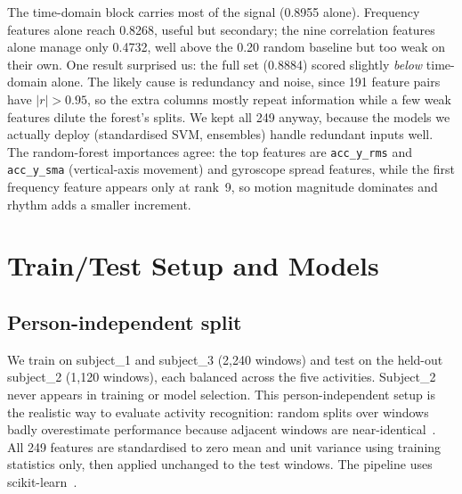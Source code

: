 \documentclass[runningheads]{llncs}
\begin{document}
The time-domain block carries most of the signal (0.8955 alone). Frequency features alone reach 0.8268, useful but secondary; the nine correlation features alone manage only 0.4732, well above the 0.20 random baseline but too weak on their own. One result surprised us: the full set (0.8884) scored slightly \emph{below} time-domain alone. The likely cause is redundancy and noise, since 191 feature pairs have $|r| > 0.95$, so the extra columns mostly repeat information while a few weak features dilute the forest's splits. We kept all 249 anyway, because the models we actually deploy (standardised SVM, ensembles) handle redundant inputs well. The random-forest importances agree: the top features are \texttt{acc\_y\_rms} and \texttt{acc\_y\_sma} (vertical-axis movement) and gyroscope spread features, while the first frequency feature appears only at rank~9, so motion magnitude dominates and rhythm adds a smaller increment.


\section{Train/Test Setup and Models}
\label{sec:models}

\subsection{Person-independent split}
We train on subject\_1 and subject\_3 (2{,}240 windows) and test on the held-out subject\_2 (1{,}120 windows), each balanced across the five activities. Subject\_2 never appears in training or model selection. This person-independent setup is the realistic way to evaluate activity recognition: random splits over windows badly overestimate performance because adjacent windows are near-identical~\cite{hammerla2016}. All 249 features are standardised to zero mean and unit variance using training statistics only, then applied unchanged to the test windows. The pipeline uses scikit-learn~\cite{pedregosa2011}.
\end{document}
